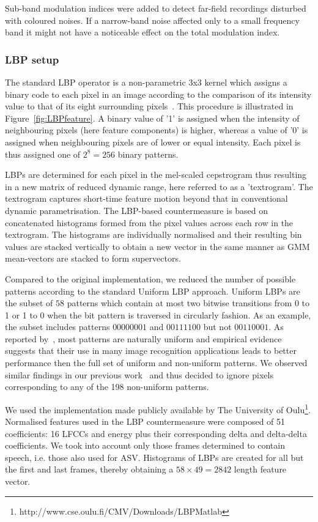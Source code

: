 Sub-band modulation indices were added to detect far-field recordings disturbed with coloured noises. If a narrow-band noise affected only to a small frequency band it might not have a noticeable effect on the total modulation index.  



\subsubsection{LBP setup} The standard LBP operator is a non-parametric 3x3 kernel which assigns a binary code to each pixel in an image according to the comparison of its intensity value to that of its eight surrounding pixels~\cite{Ojala2002}. This procedure is illustrated in Figure~\ref{fig:LBPfeature}.  A binary value of '1' is assigned when the intensity of neighbouring pixels (here feature components) is higher, whereas a value of '0' is assigned when neighbouring pixels are of lower or equal intensity. Each pixel is thus assigned one of $2^8=256$ binary patterns.

LBPs are determined for each pixel in the mel-scaled cepstrogram thus resulting in a new matrix of reduced dynamic range, here referred to as a 'textrogram'.  The textrogram captures short-time feature motion beyond that in conventional dynamic parametrisation.  The LBP-based countermeasure is based on concatenated histograms formed from the pixel values across each row in the textrogram.  The histograms are individually normalised and their resulting bin values are stacked vertically to obtain a new vector in the same manner as GMM mean-vectors are stacked to form supervectors.  

Compared to the original implementation, we reduced the number of possible patterns according to the standard Uniform LBP approach. Uniform LBPs are the subset of $58$ patterns which contain at most two bitwise transitions from 0 to 1 or 1 to 0 when the bit pattern is traversed in circularly fashion.  As an example, the subset includes patterns $00000001$ and $00111100$ but not $00110001$.  As reported by~\cite{Ojala2002}, most patterns are naturally uniform and empirical evidence suggests that their use in many image recognition applications leads to better performance then the full set of uniform and non-uniform patterns.  We observed similar findings in our previous work~\cite{Alegre2013a} and thus decided to ignore pixels corresponding to any of the 198 non-uniform patterns.

We used the implementation made publicly available by The University of Oulu\footnote{http://www.cse.oulu.fi/CMV/Downloads/LBPMatlab}. Normalised features used in the LBP countermeasure were composed of 51 coefficients: 16 LFCCs and energy plus their corresponding delta and delta-delta coefficients. We took into account only those frames determined to contain speech, i.e. those also used for ASV. Histograms of LBPs are created for all but the first and last frames, thereby obtaining a $58 \times 49 = 2842$ length feature vector.

